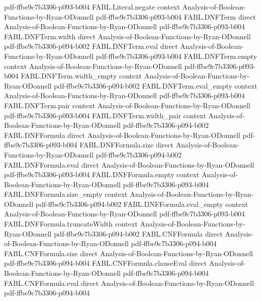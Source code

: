\begin{theorem}
  {pdf-ffbe9c7b3306-p093-b004}
\proofstep
  {FABL.Literal.negate}
  {context}
  {Analysis-of-Boolean-Functions-by-Ryan-ODonnell}
  {pdf-ffbe9c7b3306-p093-b004}
\proofstep
  {FABL.DNFTerm}
  {direct}
  {Analysis-of-Boolean-Functions-by-Ryan-ODonnell}
  {pdf-ffbe9c7b3306-p093-b004}
\proofstep
  {FABL.DNFTerm.width}
  {direct}
  {Analysis-of-Boolean-Functions-by-Ryan-ODonnell}
  {pdf-ffbe9c7b3306-p094-b002}
\proofstep
  {FABL.DNFTerm.eval}
  {direct}
  {Analysis-of-Boolean-Functions-by-Ryan-ODonnell}
  {pdf-ffbe9c7b3306-p093-b004}
\proofstep
  {FABL.DNFTerm.empty}
  {context}
  {Analysis-of-Boolean-Functions-by-Ryan-ODonnell}
  {pdf-ffbe9c7b3306-p093-b004}
\proofstep
  {FABL.DNFTerm.width_empty}
  {context}
  {Analysis-of-Boolean-Functions-by-Ryan-ODonnell}
  {pdf-ffbe9c7b3306-p094-b002}
\proofstep
  {FABL.DNFTerm.eval_empty}
  {context}
  {Analysis-of-Boolean-Functions-by-Ryan-ODonnell}
  {pdf-ffbe9c7b3306-p093-b004}
\proofstep
  {FABL.DNFTerm.pair}
  {context}
  {Analysis-of-Boolean-Functions-by-Ryan-ODonnell}
  {pdf-ffbe9c7b3306-p093-b004}
\proofstep
  {FABL.DNFTerm.width_pair}
  {context}
  {Analysis-of-Boolean-Functions-by-Ryan-ODonnell}
  {pdf-ffbe9c7b3306-p094-b002}
\proofstep
  {FABL.DNFFormula}
  {direct}
  {Analysis-of-Boolean-Functions-by-Ryan-ODonnell}
  {pdf-ffbe9c7b3306-p093-b004}
\proofstep
  {FABL.DNFFormula.size}
  {direct}
  {Analysis-of-Boolean-Functions-by-Ryan-ODonnell}
  {pdf-ffbe9c7b3306-p094-b002}
\proofstep
  {FABL.DNFFormula.eval}
  {direct}
  {Analysis-of-Boolean-Functions-by-Ryan-ODonnell}
  {pdf-ffbe9c7b3306-p093-b004}
\proofstep
  {FABL.DNFFormula.empty}
  {context}
  {Analysis-of-Boolean-Functions-by-Ryan-ODonnell}
  {pdf-ffbe9c7b3306-p093-b004}
\proofstep
  {FABL.DNFFormula.size_empty}
  {context}
  {Analysis-of-Boolean-Functions-by-Ryan-ODonnell}
  {pdf-ffbe9c7b3306-p094-b002}
\proofstep
  {FABL.DNFFormula.eval_empty}
  {context}
  {Analysis-of-Boolean-Functions-by-Ryan-ODonnell}
  {pdf-ffbe9c7b3306-p093-b004}
\proofstep
  {FABL.DNFFormula.truncateWidth}
  {context}
  {Analysis-of-Boolean-Functions-by-Ryan-ODonnell}
  {pdf-ffbe9c7b3306-p094-b002}
\proofstep
  {FABL.CNFFormula}
  {direct}
  {Analysis-of-Boolean-Functions-by-Ryan-ODonnell}
  {pdf-ffbe9c7b3306-p094-b004}
\proofstep
  {FABL.CNFFormula.size}
  {direct}
  {Analysis-of-Boolean-Functions-by-Ryan-ODonnell}
  {pdf-ffbe9c7b3306-p094-b004}
\proofstep
  {FABL.CNFFormula.clauseEval}
  {direct}
  {Analysis-of-Boolean-Functions-by-Ryan-ODonnell}
  {pdf-ffbe9c7b3306-p094-b004}
\proofstep
  {FABL.CNFFormula.eval}
  {direct}
  {Analysis-of-Boolean-Functions-by-Ryan-ODonnell}
  {pdf-ffbe9c7b3306-p094-b004}

\end{theorem}
